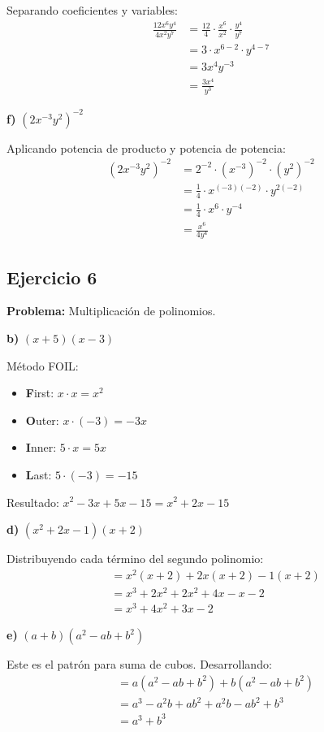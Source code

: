 Separando coeficientes y variables:
\begin{align}
\frac{12x^6y^4}{4x^2y^7} &= \frac{12}{4} \cdot \frac{x^6}{x^2} \cdot \frac{y^4}{y^7}\\
&= 3 \cdot x^{6-2} \cdot y^{4-7}\\
&= 3x^4y^{-3}\\
&= \frac{3x^4}{y^3}
\end{align}

\textbf{f)} $(2x^{-3}y^2)^{-2}$

Aplicando potencia de producto y potencia de potencia:
\begin{align}
(2x^{-3}y^2)^{-2} &= 2^{-2} \cdot (x^{-3})^{-2} \cdot (y^2)^{-2}\\
&= \frac{1}{4} \cdot x^{(-3)(-2)} \cdot y^{2(-2)}\\
&= \frac{1}{4} \cdot x^6 \cdot y^{-4}\\
&= \frac{x^6}{4y^4}
\end{align}

\subsection*{Ejercicio 6}

\textbf{Problema:} Multiplicación de polinomios.

\textbf{b)} $(x + 5)(x - 3)$

Método FOIL:
\begin{itemize}
    \item \textbf{F}irst: $x \cdot x = x^2$
    \item \textbf{O}uter: $x \cdot (-3) = -3x$
    \item \textbf{I}nner: $5 \cdot x = 5x$
    \item \textbf{L}ast: $5 \cdot (-3) = -15$
\end{itemize}

Resultado: $x^2 - 3x + 5x - 15 = x^2 + 2x - 15$

\textbf{d)} $(x^2 + 2x - 1)(x + 2)$

Distribuyendo cada término del segundo polinomio:
\begin{align}
&= x^2(x + 2) + 2x(x + 2) - 1(x + 2)\\
&= x^3 + 2x^2 + 2x^2 + 4x - x - 2\\
&= x^3 + 4x^2 + 3x - 2
\end{align}

\textbf{e)} $(a + b)(a^2 - ab + b^2)$

Este es el patrón para suma de cubos. Desarrollando:
\begin{align}
&= a(a^2 - ab + b^2) + b(a^2 - ab + b^2)\\
&= a^3 - a^2b + ab^2 + a^2b - ab^2 + b^3\\
&= a^3 + b^3
\end{align}

